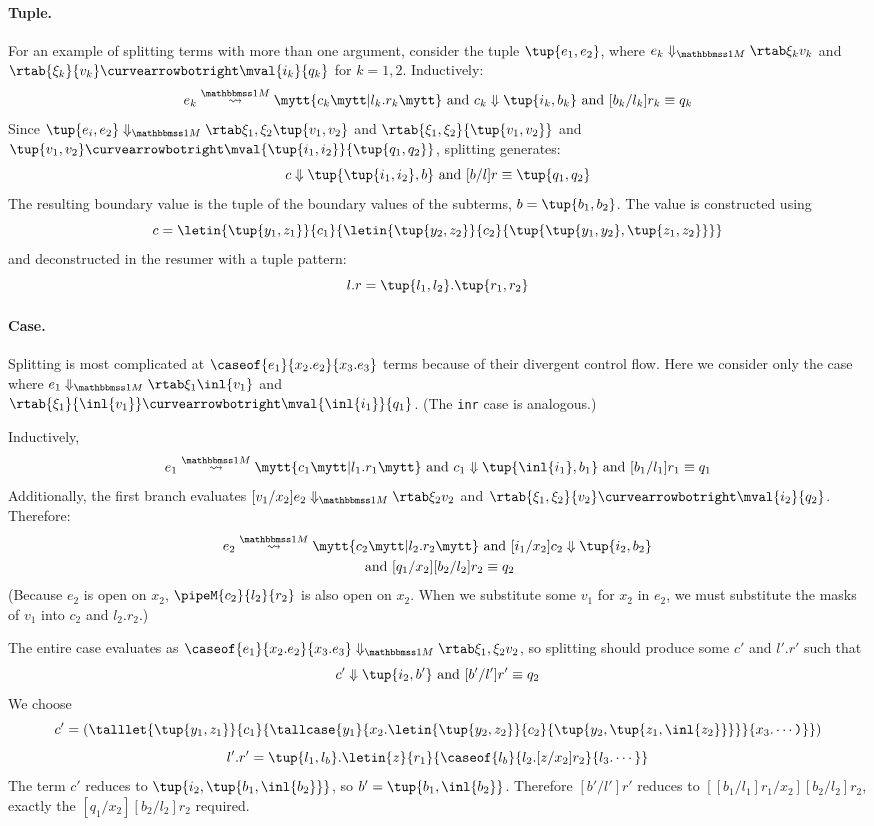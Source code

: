 \begin{abstrsyn}
\paragraph{Tuple.} For an example of splitting terms with more than one argument, consider the tuple $\tup{e_1,e_2}$,
where $\diaone {e_k} {\xi_k} {v_k}$ and 
$\rtab {\xi_k} {v_k} \vsplito \mval {i_k} {q_k}$ for $k = 1,2$.  
Inductively:
\[
	\splitone {e_k} A {c_k} {l_k.r_k} \text{ and } \reduce {c_k} {\tup{i_k,b_k}} \text{ and } [b_k/l_k]r_k \equiv q_k
\]
Since $\diaone {\tup{e_i,e_2}} {\xi_1,\xi_2} {\tup{v_1,v_2}}$ 
and $\rtab {\xi_1,\xi_2} {\tup{v_1,v_2}}$ and $\tup{v_1,v_2} \vsplito \mval {\tup{i_1,i_2}} {\tup{q_1,q_2}}$,
splitting generates:
\[
	\reduce {c} {\tup{\tup{i_1,i_2},b}} \text{ and } [b/l]r \equiv \tup{q_1,q_2}
\]
The resulting boundary value is the tuple of the boundary values of
the subterms, $b = \tup{b_1,b_2}$.  The value is 
constructed using
\[
c = \letin{\tup{y_1,z_1}}{c_1}{\letin{\tup{y_2,z_2}}{c_2}{\tup{\tup{y_1, y_2},\tup{z_1, z_2}}}}
\]
and deconstructed in the resumer with a tuple pattern:
\[
l.r = \tup{l_1,l_2}.\tup{r_1,r_2}
\]
\paragraph {Case.}
Splitting is most complicated at $\caseof {e_1} {x_2.e_2} {x_3.e_3}$ terms because of their divergent control flow.
Here we consider only the case where
$\diaone {e_1} {\xi_1} {\inl {v_1}}$ and \\ $\rtab {\xi_1} {\inl {v_1}} \vsplito \mval {\inl {i_1}} {q_1}$.
(The \texttt{inr} case is analogous.)

\noindent
Inductively,
\[
	\splitone {e_1} A {c_1} {l_1.r_1} \text{ and } \reduce {c_1} {\tup{\inl {i_1},b_1}} \text{ and } [b_1/l_1]r_1 \equiv q_1
\]
Additionally, the first branch evaluates $\diaone {[v_1/x_2]e_2} {\xi_2} {v_2}$
and $\rtab {\xi_1,\xi_2} {v_2} \vsplito \mval {i_2} {q_2}$.
Therefore:
\begin{gather*}
	\splitone {e_2} A {c_2} {l_2.r_2} \text{ and } \reduce {[i_1/x_2]c_2}
  {\tup{i_2,b_2}} \\
\text{ and } [q_1/x_2][b_2/l_2]r_2 \equiv q_2
\end{gather*}
(Because $e_2$ is open on $x_2$, $\pipeM{c_2}{l_2}{r_2}$ is also open on $x_2$.
When we substitute some $v_1$ for $x_2$ in $e_2$, we must substitute the masks
of $v_1$ into $c_2$ and $l_2.r_2$.)

The entire case evaluates as
$\diaone {\caseof {e_1} {x_2.e_2} {x_3.e_3}} {\xi_1,\xi_2} {v_2}$, so splitting should produce 
some $c'$ and
$l'.r'$ such that 
\[
  \reduce {c'} {\tup{i_2,b'}} \text{ and }
  [b'/l']r' \equiv q_2
\]
We choose
\[
c' =
{\left(
\talllet{\tup{y_1,z_1}}{c_1}{
\tallcase{y_1}
{x_2.\letin{\tup{y_2,z_2}}{c_2}{\tup{y_2,\tup{z_1,\inl{z_2}}}}}
{x_3.\cdots\ttrpar}
}\right)}
\]
\[
l'.r' =
\tup{l_1,l_b}.\letin{z}{r_1}{\caseof{l_b}{l_2.[z/x_2]{r_2}}{l_3.\cdots}}
\]
The term $c'$ reduces to
$\tup{i_2,\tup{b_1,\inl{b_2}}}$, so 
$b' = \tup{b_1,\inl{b_2}}$. Therefore
$[b'/l']r'$ reduces to
$[[b_1/l_1]r_1/x_2][b_2/l_2]r_2$, exactly the 
$[q_1/x_2][b_2/l_2]r_2$ required.


\end{abstrsyn}
